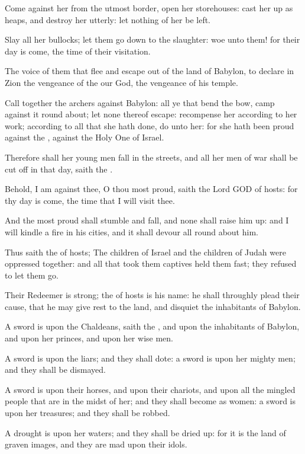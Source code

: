 \Verse Come against her from the utmost border, open her storehouses: cast her up as heaps, and destroy her utterly: let nothing of her be left.

\Verse Slay all her bullocks; let them go down to the slaughter: woe unto them! for their day is come, the time of their visitation.

\Verse The voice of them that flee and escape out of the land of Babylon, to declare in Zion the vengeance of the \LORD our God, the vengeance of his temple.

\Verse Call together the archers against Babylon: all ye that bend the bow, camp against it round about; let none thereof escape: recompense her according to her work; according to all that she hath done, do unto her: for she hath been proud against the \LORD, against the Holy One of Israel.

\Verse Therefore shall her young men fall in the streets, and all her men of war shall be cut off in that day, saith the \LORD.

\Verse Behold, I am against thee, O thou most proud, saith the Lord GOD of hosts: for thy day is come, the time that I will visit thee.

\Verse And the most proud shall stumble and fall, and none shall raise him up: and I will kindle a fire in his cities, and it shall devour all round about him.

\Verse Thus saith the \LORD of hosts; The children of Israel and the children of Judah were oppressed together: and all that took them captives held them fast; they refused to let them go.

\Verse Their Redeemer is strong; the \LORD of hosts is his name: he shall throughly plead their cause, that he may give rest to the land, and disquiet the inhabitants of Babylon.

\Verse A sword is upon the Chaldeans, saith the \LORD, and upon the inhabitants of Babylon, and upon her princes, and upon her wise men.

\Verse A sword is upon the liars; and they shall dote: a sword is upon her mighty men; and they shall be dismayed.

\Verse A sword is upon their horses, and upon their chariots, and upon all the mingled people that are in the midst of her; and they shall become as women: a sword is upon her treasures; and they shall be robbed.

\Verse A drought is upon her waters; and they shall be dried up: for it is the land of graven images, and they are mad upon their idols.

